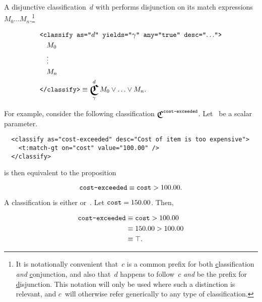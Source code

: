 \begin{definition}
  A disjunctive classification~$d$ with 
    performs disjunction on its match expressions
    $M_0\ldots M_n$.\footnote{%
      It is notationally convenient that~$c$ is a common prefix for both
        \underline{c}lassification \emph{and} \underline{c}onjunction,
          and also that~$d$ happens to follow~$c$ \emph{and} be the prefix for
          \underline{d}isjunction.
      This notation will only be used where such a distinction is relevant,
        and $c$~will otherwise refer generically to any type of
        classification.}

  \begin{align*}
    &\xml{<classify as="$d$" yields="$\gamma$" any="true" desc="$\ldots$">} \\
    &\quad M_0 \\
    &\quad \vdots \\
    &\quad M_n \\
    &\texttt{</classify>}
      \equiv \Classify^d_\gamma M_0 \logor \ldots \logor M_n.
  \end{align*}
\end{definition}

For example,
  consider the following classification $\Classify^\texttt{cost-exceeded}$.
Let~ be a scalar parameter.

\begin{lstlisting}
  <classify as="cost-exceeded" desc="Cost of item is too expensive">
    <t:match-gt on="cost" value="100.00" />
  </classify>
\end{lstlisting}

\noindent
is then equivalent to the proposition

\begin{equation*}
  \texttt{cost-exceeded} \equiv \texttt{cost} > 100.00.
\end{equation*}

A classification is either \true or~\false.
Let $\texttt{cost}=150.00$.
Then,

\begin{align*}
  \texttt{cost-exceeded} & \equiv \texttt{cost} > 100.00 \\
                            & \equiv 150.00 > 100.00 \\
                            & \equiv \top.
\end{align*}

